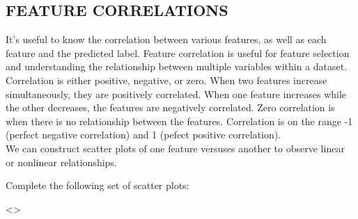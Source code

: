 \documentclass[11pt]{article}
\begin{document}
    \hypertarget{feature-correlations}{%
\subsection{FEATURE CORRELATIONS}\label{feature-correlations}}

It's useful to know the correlation between various features, as well as
each feature and the predicted label. Feature correlation is useful for
feature selection and understanding the relationship between multiple
variables within a dataset. Correlation is either positive, negative, or
zero. When two features increase simultaneously, they are positively
correlated. When one feature increases while the other decreases, the
features are negatively correlated. Zero correlation is when there is no
relationship between the features. Correlation is on the range -1
(perfect negative correlation) and 1 (pefect positive correlation).\\
We can construct scatter plots of one feature versuses another to
observe linear or nonlinear relationships.

Complete the following set of scatter plots:

\textless{}\center\textgreater{}
\end{document}
